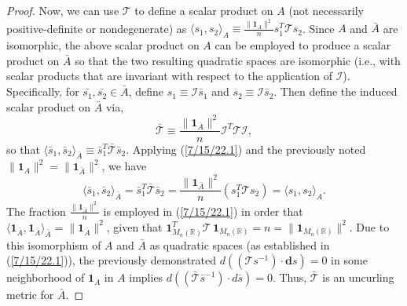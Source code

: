 \documentclass{amsart}
\theoremstyle{definition}
\numberwithin{theorem}{section}
\numberwithin{equation}{section}
\begin{document}
\begin{proof}
   Now, we can use $\mathcal{\mathcal{T}}$ to define a scalar product on $A$ (not necessarily positive-definite or nondegenerate) as $\langle s_1,s_2\rangle_A \equiv  \frac{\|\mathbf{1}_{A}\|^2}{n}s_1^T \mathcal{\mathcal{T}} s_2$. 
    Since $A$ and $\bar{A}$ are isomorphic, the above scalar product on $A$ can be employed to produce a scalar product on $\bar{A}$ so that the two resulting quadratic spaces are isomorphic (i.e., with scalar products that are invariant with respect to the application of $\mathcal{I}$).  Specifically, for $\bar{s_1},\bar{s_2}\in\bar{A}$, define $s_1 \equiv \mathcal{I}\bar{s}_1$ and $s_2 \equiv \mathcal{I}\bar{s}_2$.  Then define the induced scalar product on $\bar{A}$ via, \begin{equation}\label{7/15/22.1} \bar{\mathcal{\mathcal{T}}} \equiv  \frac{\|\mathbf{1}_{\bar{A}}\|^2}{n}\mathcal{I}^T\mathcal{\mathcal{T}}\mathcal{I},\end{equation} so that $\langle \bar{s}_1,\bar{s}_2\rangle_{\bar{A}} \equiv \bar{s}_1^T \bar{\mathcal{\mathcal{T}}} \bar{s}_2$.  Applying (\ref{7/15/22.1}) and the previously noted $\|\mathbf{1}_A\|^2 = \|\mathbf{1}_{\bar{A}}\|^2$, we have \begin{equation}\label{8/25/22.1} \langle \bar{s}_1,\bar{s}_2\rangle_{\bar{A}} = \bar{s}_1^T \bar{\mathcal{T}} \bar{s}_2 = \frac{\|\mathbf{1}_{\bar{A}}\|^2}{n}( s_1^T \mathcal{T} s_2) = \langle s_1,s_2\rangle_{A}.\end{equation}  The fraction $\frac{\|\mathbf{1}_{\bar{A}}\|^2}{n}$ is employed in (\ref{7/15/22.1}) in order that $\langle \mathbf{1}_{\bar{A}},\mathbf{1}_{\bar{A}}\rangle_{\bar{A}} = \|\mathbf{1}_{\bar{A}}\|^2$, given that $\mathbf{1}_{M_n(\mathbb{R})}^T \mathcal{T}\,\mathbf{1}_{M_n(\mathbb{R})} = n = \|\mathbf{1}_{M_n(\mathbb{R})}\|^2$. Due to this isomorphism of $A$ and $\bar{A}$ as quadratic spaces (as established in (\ref{7/15/22.1})), the previously demonstrated \mbox{$d((\mathcal{T}s^{-1})\cdot \mathbf{d}s) = 0$} in some neighborhood of $\mathbf{1}_A$ in $A$ implies 
\mbox{$d((\bar{\mathcal{T}}\bar{s}^{-1})\cdot d\bar{s}) = 0$.} Thus, $\bar{\mathcal{T}}$ is an uncurling metric for $\bar{A}$.



\end{proof}
\end{document}

